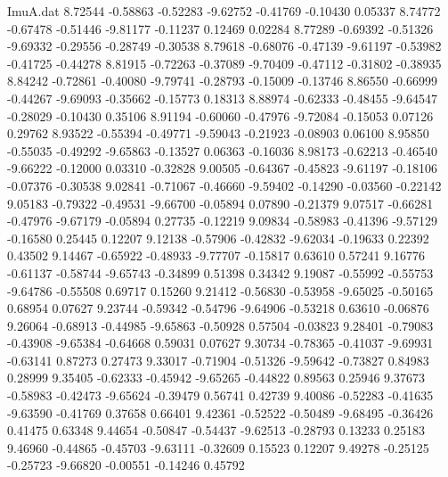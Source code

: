 \begin{filecontents}{ImuA.dat}
   8.72544   -0.58863   -0.52283   -9.62752   -0.41769   -0.10430    0.05337
   8.74772   -0.67478   -0.51446   -9.81177   -0.11237    0.12469    0.02284
   8.77289   -0.69392   -0.51326   -9.69332   -0.29556   -0.28749   -0.30538
   8.79618   -0.68076   -0.47139   -9.61197   -0.53982   -0.41725   -0.44278
   8.81915   -0.72263   -0.37089   -9.70409   -0.47112   -0.31802   -0.38935
   8.84242   -0.72861   -0.40080   -9.79741   -0.28793   -0.15009   -0.13746
   8.86550   -0.66999   -0.44267   -9.69093   -0.35662   -0.15773    0.18313
   8.88974   -0.62333   -0.48455   -9.64547   -0.28029   -0.10430    0.35106
   8.91194   -0.60060   -0.47976   -9.72084   -0.15053    0.07126    0.29762
   8.93522   -0.55394   -0.49771   -9.59043   -0.21923   -0.08903    0.06100
   8.95850   -0.55035   -0.49292   -9.65863   -0.13527    0.06363   -0.16036
   8.98173   -0.62213   -0.46540   -9.66222   -0.12000    0.03310   -0.32828
   9.00505   -0.64367   -0.45823   -9.61197   -0.18106   -0.07376   -0.30538
   9.02841   -0.71067   -0.46660   -9.59402   -0.14290   -0.03560   -0.22142
   9.05183   -0.79322   -0.49531   -9.66700   -0.05894    0.07890   -0.21379
   9.07517   -0.66281   -0.47976   -9.67179   -0.05894    0.27735   -0.12219
   9.09834   -0.58983   -0.41396   -9.57129   -0.16580    0.25445    0.12207
   9.12138   -0.57906   -0.42832   -9.62034   -0.19633    0.22392    0.43502
   9.14467   -0.65922   -0.48933   -9.77707   -0.15817    0.63610    0.57241
   9.16776   -0.61137   -0.58744   -9.65743   -0.34899    0.51398    0.34342
   9.19087   -0.55992   -0.55753   -9.64786   -0.55508    0.69717    0.15260
   9.21412   -0.56830   -0.53958   -9.65025   -0.50165    0.68954    0.07627
   9.23744   -0.59342   -0.54796   -9.64906   -0.53218    0.63610   -0.06876
   9.26064   -0.68913   -0.44985   -9.65863   -0.50928    0.57504   -0.03823
   9.28401   -0.79083   -0.43908   -9.65384   -0.64668    0.59031    0.07627
   9.30734   -0.78365   -0.41037   -9.69931   -0.63141    0.87273    0.27473
   9.33017   -0.71904   -0.51326   -9.59642   -0.73827    0.84983    0.28999
   9.35405   -0.62333   -0.45942   -9.65265   -0.44822    0.89563    0.25946
   9.37673   -0.58983   -0.42473   -9.65624   -0.39479    0.56741    0.42739
   9.40086   -0.52283   -0.41635   -9.63590   -0.41769    0.37658    0.66401
   9.42361   -0.52522   -0.50489   -9.68495   -0.36426    0.41475    0.63348
   9.44654   -0.50847   -0.54437   -9.62513   -0.28793    0.13233    0.25183
   9.46960   -0.44865   -0.45703   -9.63111   -0.32609    0.15523    0.12207
   9.49278   -0.25125   -0.25723   -9.66820   -0.00551   -0.14246    0.45792

\end{filecontents}
